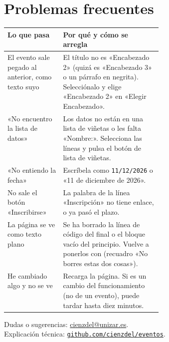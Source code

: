 \documentclass[a4paper,11pt]{article}
\newcommand{\boton}[1]{\tcbox[on line, colback=white, colframe=DarkGray3, boxrule=0.4pt, arc=1mm,
  left=1.2mm, right=1.2mm, top=0.3mm, bottom=0.3mm, boxsep=0pt]{\small\strut #1}}
\newcommand{\web}[1]{\href{https://#1}{\nolinkurl{#1}}}
\begin{document}
\section{Problemas frecuentes}
\begin{tabularx}{\linewidth}{@{}>{\raggedright\arraybackslash}p{0.36\linewidth} X@{}}
\toprule
Lo que pasa & Por qué y cómo se arregla \\
\midrule
El evento sale pegado al anterior, como texto suyo & El título no es «Encabezado 2» (quizá es «Encabezado 3»
  o un párrafo en negrita). Selecciónalo y elige «Encabezado 2» en «Elegir Encabezado». \\
«No encuentro la lista de datos» & Los datos no están en una lista de viñetas o les falta «Nombre:».
  Selecciona las líneas y pulsa el botón de lista de viñetas. \\
«No entiendo la fecha» & Escríbela como \texttt{11/12/2026} o «11 de diciembre de 2026». \\
No sale el botón «Inscribirse» & La palabra de la línea «Inscripción» no tiene enlace, o ya pasó el plazo. \\
La página se ve como texto plano & Se ha borrado la línea de código del final o el bloque vacío del
  principio. Vuelve a ponerlos con \boton{Fuente} (recuadro «No borres estas dos cosas»). \\
He cambiado algo y no se ve & Recarga la página. Si es un cambio del funcionamiento (no de un evento),
  puede tardar hasta diez minutos. \\
\bottomrule
\end{tabularx}

\vspace{6pt}
Dudas o sugerencias: \href{mailto:cienzdel@unizar.es}{cienzdel@unizar.es}.\\
Explicación técnica: \web{github.com/cienzdel/eventos}.
\end{document}

